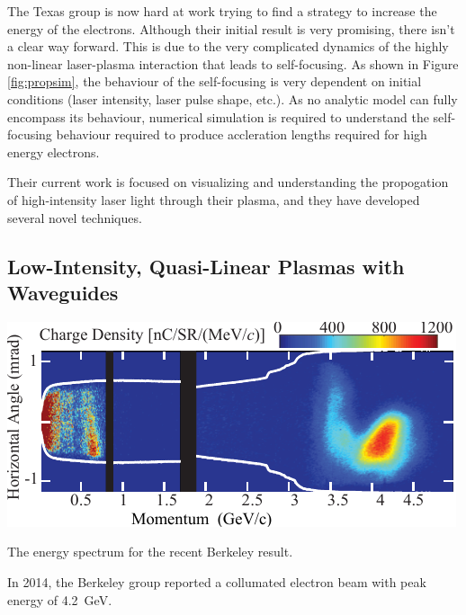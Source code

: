 \documentclass[12pt,letter]{article}
\begin{document}
The Texas group is now hard at work trying to find a strategy to increase the
energy of the electrons. Although their initial result is very promising, there
isn't a clear way forward. This is due to the very complicated dynamics of the
highly non-linear laser-plasma interaction that leads to self-focusing. As
shown in Figure \ref{fig:propsim}, the behaviour of the self-focusing is very
dependent on initial conditions (laser intensity, laser pulse shape, etc.). As
no analytic model can fully encompass its behaviour, numerical simulation is
required to understand the self-focusing behaviour required to produce
accleration lengths required for high energy electrons.

Their current work is focused on visualizing and understanding the propogation
of high-intensity laser light through their plasma, and they have developed
several novel techniques.


\subsection{Low-Intensity, Quasi-Linear Plasmas with Waveguides}

\begin{marginfigure}
    \includegraphics[width=\marginparwidth]{../figures/esaenergy.pdf}
    \caption{The energy spectrum for the recent Berkeley result.}
\end{marginfigure}


In 2014, the Berkeley group reported a collumated electron beam with peak
energy of \SI{4.2}{\giga \electronvolt}.
\end{document}
